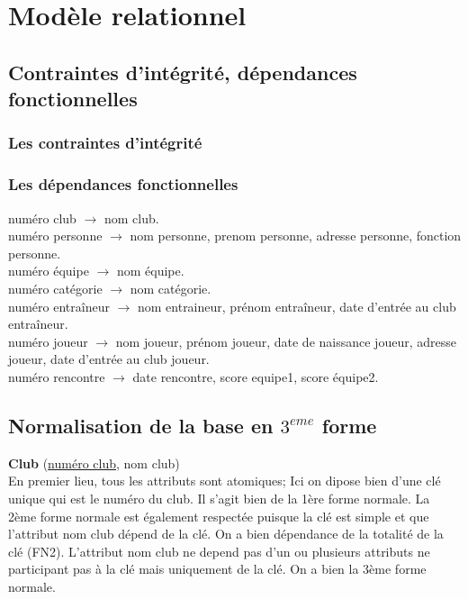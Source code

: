 \documentclass{article}
\begin{document}
\newpage
\section{Modèle relationnel}


\subsection{Contraintes d'intégrité, dépendances fonctionnelles}

\subsubsection*{Les contraintes d'intégrité}


\newpage
\subsubsection*{Les dépendances fonctionnelles}

numéro club $\rightarrow$ nom club.  \\
numéro personne $\rightarrow$ nom personne, prenom personne, adresse personne, fonction personne. \\
numéro équipe $\rightarrow$ nom équipe.\\
numéro catégorie $\rightarrow$ nom catégorie.\\
numéro entraîneur $\rightarrow$ nom entraineur, prénom entraîneur, date d'entrée au club entraîneur. \\
numéro joueur $\rightarrow$ nom joueur, prénom joueur, date de naissance joueur, adresse joueur, date d'entrée au club joueur. \\
numéro rencontre $\rightarrow$ date rencontre, score equipe1, score équipe2. \\



\subsection{Normalisation de la base en $3^{eme}$ forme}

\textbf{Club} (\underline{numéro club}, nom club) \\
En premier lieu, tous les attributs sont atomiques; Ici on dipose bien d'une clé unique qui est le numéro du club. Il s'agit bien de la 1ère forme normale. La 2ème forme normale est également respectée puisque la clé est simple et que l'attribut nom club dépend de la clé. On a bien dépendance de la totalité de la clé (FN2). L'attribut nom club ne depend pas d'un ou plusieurs attributs ne participant pas à la clé mais uniquement de la clé. On a bien la 3ème forme normale. \\
\end{document}
